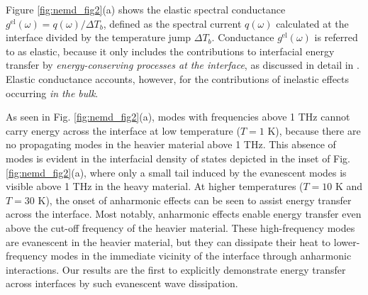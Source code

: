 
Figure \ref{fig:nemd_fig2}(a) shows the elastic spectral conductance $g^{\textrm{el}}(\omega)=q(\omega)/\Delta T_b$, defined as the spectral current $q(\omega)$ calculated at the interface divided by the temperature jump $\Delta T_b$. Conductance $g^{\textrm{el}}(\omega)$ is referred to as elastic, because it only includes the contributions to interfacial energy transfer by \textit{energy-conserving processes at the interface}, as discussed in detail in . Elastic conductance accounts, however, for the contributions of inelastic effects occurring \textit{in the bulk}. 

As seen in Fig. \ref{fig:nemd_fig2}(a), modes with frequencies above 1 THz cannot carry energy across the interface at low temperature ($T=1$ K), because there are no propagating modes in the heavier material above 1 THz. This absence of modes is evident in the interfacial density of states depicted in the inset of Fig. \ref{fig:nemd_fig2}(a), where only a small tail induced by the evanescent modes is visible above 1 THz in the heavy material. At higher temperatures ($T=10$ K and $T=30$ K), the onset of anharmonic effects can be seen to assist energy transfer across the interface. Most notably, anharmonic effects enable energy transfer even above the cut-off frequency of the heavier material. These high-frequency modes are evanescent in the heavier material, but they can dissipate their heat to lower-frequency modes in the immediate vicinity of the interface through anharmonic interactions. Our results are the first to explicitly demonstrate energy transfer across interfaces by such evanescent wave dissipation.

